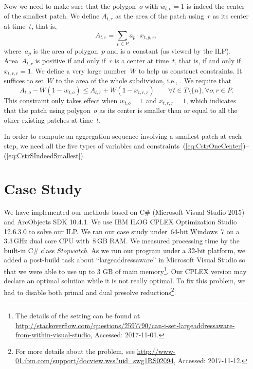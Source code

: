 Now we need to make sure that 
the polygon~$o$ with $w_{t,o}=1$ is indeed 
the center of the smallest patch.
We define $A_{t,r}$ as the area of 
the patch using~$r$ as its center at time~$t$, 
that is,
\[
A_{t,r}=\sum_{p\in P} a_p \cdot x_{t,p,r},
\] 
where~$a_p$ is the area of polygon~$p$ 
and is a constant (as viewed by the ILP).
Area~$A_{t,r}$ is positive 
if and only if~$r$ is a center at time~$t$,
that is, if and only if~$x_{t,r,r}=1$.
We define a 
very large number~$W$ to help us construct constraints.
It suffices to set~$W$ to 
the area of the whole subdivision, i.e., \Pgoal. 
We require that
\begin{equation}
\label{eq:CstrSIndeedSmallest}
A_{t,o}-W(1-w_{t,o}) \le A_{t,r}+W(1-x_{t,r,r}) \qquad
\forall t 	 \in {T}\setminus \{n\}, 
\forall o, r \in P.
\end{equation}
This constraint only takes effect when $w_{t,o}=1$ and 
$x_{t,r,r}=1$, which indicates that 
the patch using polygon~$o$ as its center 
is smaller than or equal to all the other existing 
patches at time~$t$.

In order to compute an aggregation sequence 
involving a smallest patch at each step, 
we need all the five types of variables and 
constraints~(\ref{eq:CstrOneCenter})--(\ref{eq:CstrSIndeedSmallest}).



\section{Case Study}
\label{sec:AreaAgg_CaseStudy}
We have implemented our methods 
based on C\# (Microsoft Visual Studio 2015) 
and ArcObjects SDK 10.4.1.
We use IBM ILOG
CPLEX Optimization Studio 12.6.3.0 to solve our ILP. 
We ran our case study under~64-bit 
Windows~7 on a~$3.3\,$GHz dual core CPU with~$8\,$GB RAM.
We measured processing time 
by the built-in C\# class \emph{Stopwatch}.
As we run our program under a 32-bit platform, 
we added a post-build task about ``largeaddressaware''
in Microsoft Visual Studio
so that we were able to use up to 3 GB of main memory\footnote{
The details of the setting can be found at 	
\url{http://stackoverflow.com/questions/2597790/can-i-set-largeaddressaware-from-within-visual-studio},
Accessed: 2017-11-01.}.
Our CPLEX  version may declare an optimal solution
while it is not really optimal.
To fix this problem, we had to disable 
both primal and dual presolve reductions\footnote{
For more details about the problem, see
\url{http://www-01.ibm.com/support/docview.wss?uid=swg1RS02094},
Accessed: 2017-11-12.}.

